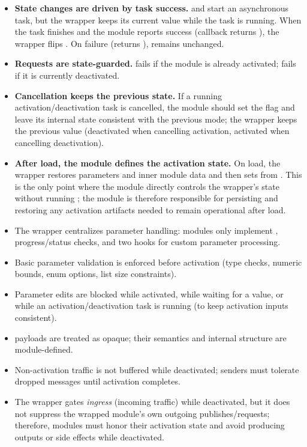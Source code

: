 \begin{itemize}
    \item \textbf{State changes are driven by task success.}  and  start an asynchronous task, but the wrapper keeps its current  value while the task is running. When the task finishes and the module reports success (callback returns ), the wrapper flips . On failure (returns ),  remains unchanged.
    \item \textbf{Requests are state-guarded.}  fails if the module is already activated;  fails if it is currently deactivated.
    \item \textbf{Cancellation keeps the previous state.} If a running activation/deactivation task is cancelled, the module should set the  flag and leave its internal state consistent with the previous mode; the wrapper keeps the previous  value (deactivated when cancelling activation, activated when cancelling deactivation).
    \item \textbf{After load, the module defines the activation state.} On load, the wrapper restores parameters and inner module data and then sets  from . This is the only point where the module directly controls the wrapper's state without running ; the module is therefore responsible for persisting and restoring any activation artifacts needed to remain operational after load.
\end{itemize}



\begin{itemize}
    \item The wrapper centralizes parameter handling: modules only implement , progress/status checks, and two hooks for custom parameter processing.
    \item Basic parameter validation is enforced before activation (type checks, numeric bounds, enum options, list size constraints).
    \item Parameter edits are blocked while activated, while waiting for a  value, or while an activation/deactivation task is running (to keep activation inputs consistent).
    \item {} payloads are treated as opaque; their semantics and internal structure are module-defined.
    \item Non-activation traffic is not buffered while deactivated; senders must tolerate dropped messages until activation completes.
    \item The wrapper gates \emph{ingress} (incoming traffic) while deactivated, but it does not suppress the wrapped module's own outgoing publishes/requests; therefore, modules must honor their activation state and avoid producing outputs or side effects while deactivated.
\end{itemize}

